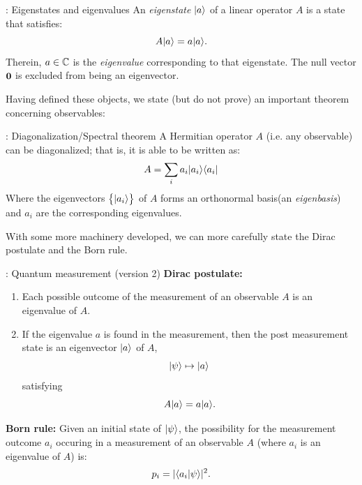 \begin{defbox}{: Eigenstates and eigenvalues}\label{def-eigstates}
    An \emph{eigenstate} $\lvert a \rangle$ of a linear operator $A$ is a state that satisfies:
    \begin{equation}
        A\lvert a \rangle = a\lvert a \rangle.
    \end{equation}
    Therein, $a \in \mathbb{C}$ is the \emph{eigenvalue} corresponding to that eigenstate. The null vector $\mathbf{0}$ is excluded from being an eigenvector.
\end{defbox}

Having defined these objects, we state (but do not prove) an important theorem concerning observables:

\begin{thmbox}{: Diagonalization/Spectral theorem}
    A Hermitian operator $A$ (i.e. any observable) can be diagonalized; that is, it is able to be written as:
    \begin{equation}
        A = \sum_i a_i \lvert a_i \rangle \langle a_i \rvert
    \end{equation}
    Where the eigenvectors $\set{\lvert a_i \rangle}$ of $A$ forms an orthonormal basis\footnotemark (an \emph{eigenbasis}) and $a_i$ are the corresponding eigenvalues.
\end{thmbox}
With some more machinery developed, we can more carefully state the Dirac postulate and the Born rule.

\begin{axiombox}{: Quantum measurement (version 2)}
    \textbf{Dirac postulate:}
    \begin{enumerate}
        \item Each possible outcome of the measurement of an observable $A$ is an eigenvalue of $A$.
        \item If the eigenvalue $a$ is found in the measurement, then the post measurement state is an eigenvector $\lvert a \rangle$ of $A$,
        \begin{equation}
            \lvert \psi \rangle \mapsto \lvert a \rangle
        \end{equation}
        satisfying
        \begin{equation}
            A\lvert a \rangle = a\lvert a \rangle.
        \end{equation}
    \end{enumerate}

    \textbf{Born rule:} Given an initial state of $\lvert \psi \rangle$, the possibility for the measurement outcome $a_i$ occuring in a measurement of an observable $A$ (where $a_i$ is an eigenvalue of $A$) is:
    \begin{equation}
        p_i = \lvert \langle a_i \lvert \psi \rangle \rvert^2.
    \end{equation}
\end{axiombox}

